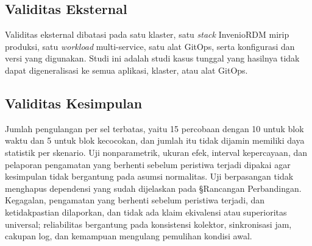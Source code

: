 \subsection{Validitas Eksternal}

Validitas eksternal dibatasi pada satu klaster, satu \textit{stack} InvenioRDM mirip produksi, satu \textit{workload} multi-service, satu alat GitOps, serta konfigurasi dan versi yang digunakan. Studi ini adalah studi kasus tunggal yang hasilnya tidak dapat digeneralisasi ke semua aplikasi, klaster, atau alat GitOps.

\subsection{Validitas Kesimpulan}

Jumlah pengulangan per sel terbatas, yaitu 15 percobaan dengan 10 untuk blok waktu dan 5 untuk blok kecocokan, dan jumlah itu tidak dijamin memiliki daya statistik per skenario. Uji nonparametrik, ukuran efek, interval kepercayaan, dan pelaporan pengamatan yang berhenti sebelum peristiwa terjadi dipakai agar kesimpulan tidak bergantung pada asumsi normalitas. Uji berpasangan tidak menghapus dependensi yang sudah dijelaskan pada §Rancangan Perbandingan. Kegagalan, pengamatan yang berhenti sebelum peristiwa terjadi, dan ketidakpastian dilaporkan, dan tidak ada klaim ekivalensi atau superioritas universal; reliabilitas bergantung pada konsistensi kolektor, sinkronisasi jam, cakupan log, dan kemampuan mengulang pemulihan kondisi awal.
